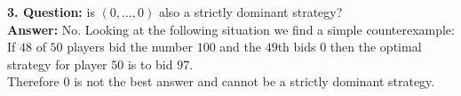 \begin{example}
	\textbf{3. Question:} is $(0, \dotsc, 0)$ also a strictly dominant strategy? \\
	\textbf{Answer:} No. Looking at the following situation we find a simple counterexample: \\
	If $48$ of $50$ players bid the number $100$ and the $49$th bids $0$ then the optimal strategy for player $50$ is to bid $97$. \\
	Therefore $0$ is not the best answer and cannot be a strictly dominant strategy.
\end{example}


\newpage